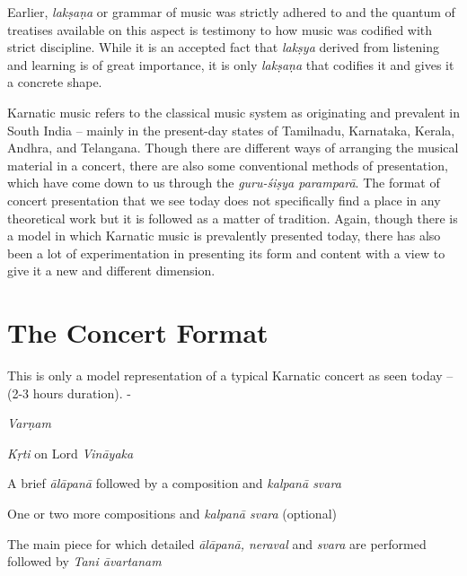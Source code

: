 Earlier, \textit{lakṣaṇa} or grammar of music was strictly adhered to and the quantum of treatises available on this aspect is testimony to how music was codified with strict discipline. While it is an accepted fact that \textit{lakṣya} derived from listening and learning is of great importance, it is only \textit{lakṣaṇa} that codifies it and gives it a concrete shape.

Karnatic music refers to the classical music system as originating and prevalent in South India – mainly in the present-day states of Tamilnadu, Karnataka, Kerala, Andhra, and Telangana. Though there are different ways of arranging the musical material in a concert, there are also some conventional methods of presentation, which have come down to us through the \textit{guru-śiṣya paramparā}. The format of concert presentation that we see today does not specifically find a place in any theoretical work but it is followed as a matter of tradition. Again, though there is a model in which Karnatic music is prevalently presented today, there has also been a lot of experimentation in presenting its form and content with a view to give it a new and different dimension.

\vspace{-.4cm}

\section*{The Concert Format}

This is only a model representation of a typical Karnatic concert as seen today – (2-3 hours duration). -

\textit{Varṇam}

\textit{Kṛti} on Lord \textit{Vināyaka}

A brief \textit{ālāpanā} followed by a composition and \textit{kalpanā svara}

One or two more compositions and \textit{kalpanā svara} (optional)

The main piece for which detailed \textit{ālāpanā, neraval} and \textit{svara} are performed followed by \textit{Tani āvartanam}

